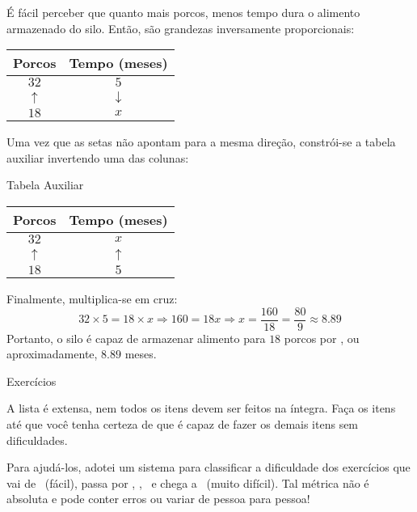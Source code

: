\documentclass[12pt]{report}
\newcommand{\1}{\faThermometerEmpty}
\newcommand{\2}{\faThermometerQuarter}
\newcommand{\3}{\faThermometerHalf}
\newcommand{\4}{\faThermometerThreeQuarters}
\newcommand{\5}{\faThermometerFull}
\begin{document}
É fácil perceber que quanto mais porcos, menos tempo dura o alimento armazenado do silo. Então, são grandezas inversamente proporcionais:

\begin{center}
\begin{tabular}{|c | c|} 
 \hline
 Porcos & Tempo (meses) \\ [0.5ex] 
 \hline \hline
 $32$ & $5$ \\ \hline
 $\uparrow$ &  $\downarrow$ \\ \hline
 $18$ & $x$ \\ 
 \hline
\end{tabular}
\end{center}

Uma vez que as setas não apontam para a mesma direção, constrói-se a tabela auxiliar invertendo uma das colunas:


\begin{center}
{\footnotesize Tabela Auxiliar} \\
\begin{tabular}{|c | c|} 
 \hline
 Porcos & Tempo (meses) \\ [0.5ex] 
 \hline \hline
 $32$ & $x$ \\ \hline
 $\uparrow$ &  $\uparrow$ \\ \hline
 $18$ & $5$ \\ 
 \hline
\end{tabular}
\end{center}

Finalmente, multiplica-se em cruz:
$$
32 \times 5 = 18 \times x \Rightarrow 160 = 18x \Rightarrow x = \frac{160}{18} = \frac{80}{9} \approx 8.89
$$
Portanto, o silo é capaz de armazenar alimento para $18$ porcos por , ou aproximadamente, $8.89$ meses.



\pagebreak

\begin{center}
{\Large Exercícios}
\end{center}

A lista é extensa, nem todos os itens devem ser feitos na íntegra. Faça os itens até que você tenha certeza de que é capaz de fazer os demais itens sem dificuldades. 

Para ajudá-los, adotei um sistema para classificar a dificuldade dos exercícios que vai de \1 \ (fácil), passa por \2 , \3 , \4 \ e chega a \5 \ (muito difícil). Tal métrica não é absoluta e pode conter erros ou variar de pessoa para pessoa!
\end{document}
